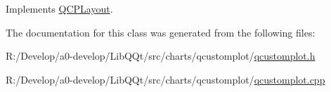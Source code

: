Implements \mbox{\hyperlink{class_q_c_p_layout_a5a79621fa0a6eabb8b520cfc04fb601a}{Q\+C\+P\+Layout}}.



The documentation for this class was generated from the following files\+:\begin{DoxyCompactItemize}
\item 
R\+:/\+Develop/a0-\/develop/\+Lib\+Q\+Qt/src/charts/qcustomplot/\mbox{\hyperlink{qcustomplot_8h}{qcustomplot.\+h}}\item 
R\+:/\+Develop/a0-\/develop/\+Lib\+Q\+Qt/src/charts/qcustomplot/\mbox{\hyperlink{qcustomplot_8cpp}{qcustomplot.\+cpp}}\end{DoxyCompactItemize}
